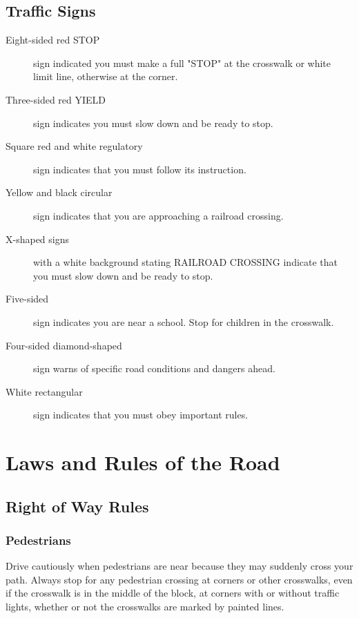 \subsection{Traffic Signs}

\begin{description}
\item[Eight-sided red STOP] sign indicated you must make a full "STOP"
at the crosswalk or white limit line, otherwise at the corner.

\item[Three-sided red YIELD] sign indicates you must slow down
and be ready to stop.

\item[Square red and white regulatory] sign
indicates that you must follow its instruction.

\item[Yellow and black circular] sign
indicates that you are approaching a railroad crossing.

\item[X-shaped signs] with a white background stating RAILROAD CROSSING
indicate that you must slow down and be ready to stop.

\item[Five-sided] sign indicates you are near a school.
Stop for children in the crosswalk.

\item[Four-sided diamond-shaped] sign
warns of specific road conditions and dangers ahead.

\item[White rectangular] sign indicates that you must obey important rules.
\end{description}


\section{Laws and Rules of the Road}

\subsection{Right of Way Rules}

\subsubsection{Pedestrians}
Drive cautiously when pedestrians are near
because they may suddenly cross your path.
Always stop for any pedestrian crossing at corners or other crosswalks,
even if the crosswalk is in the middle of the block,
at corners with or without traffic lights,
whether or not the crosswalks are marked by painted lines.

